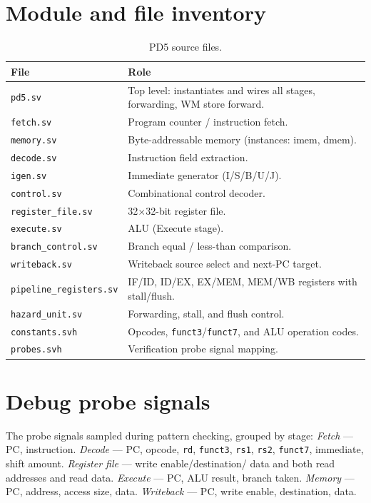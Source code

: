 \documentclass[11pt,a4paper]{article}
\newcommand{\code}[1]{\texttt{#1}}          %
\newcommand{\sig}[1]{\texttt{#1}}
\begin{document}
\appendix
\section{Module and file inventory}
\label{app:files}
\begin{table}[h]
\centering
\small
\begin{tabular}{@{}l l@{}}
\toprule
\textbf{File} & \textbf{Role} \\
\midrule
\code{pd5.sv}                  & Top level: instantiates and wires all stages, forwarding, WM store forward. \\
\code{fetch.sv}                & Program counter / instruction fetch. \\
\code{memory.sv}               & Byte-addressable memory (instances: imem, dmem). \\
\code{decode.sv}               & Instruction field extraction. \\
\code{igen.sv}                 & Immediate generator (I/S/B/U/J). \\
\code{control.sv}              & Combinational control decoder. \\
\code{register\_file.sv}       & 32$\times$32-bit register file. \\
\code{execute.sv}              & ALU (Execute stage). \\
\code{branch\_control.sv}      & Branch equal / less-than comparison. \\
\code{writeback.sv}            & Writeback source select and next-PC target. \\
\code{pipeline\_registers.sv}  & IF/ID, ID/EX, EX/MEM, MEM/WB registers with stall/flush. \\
\code{hazard\_unit.sv}         & Forwarding, stall, and flush control. \\
\code{constants.svh}           & Opcodes, \sig{funct3}/\sig{funct7}, and ALU operation codes. \\
\code{probes.svh}              & Verification probe signal mapping. \\
\bottomrule
\end{tabular}
\caption{PD5 source files.}
\end{table}

\section{Debug probe signals}
\label{app:probes}
The probe signals sampled during pattern checking, grouped by stage: \emph{Fetch} --- PC,
instruction. \emph{Decode} --- PC, opcode, \sig{rd}, \sig{funct3}, \sig{rs1}, \sig{rs2},
\sig{funct7}, immediate, shift amount. \emph{Register file} --- write enable/destination/
data and both read addresses and read data. \emph{Execute} --- PC, ALU result, branch
taken. \emph{Memory} --- PC, address, access size, data. \emph{Writeback} --- PC, write
enable, destination, data.
\end{document}
